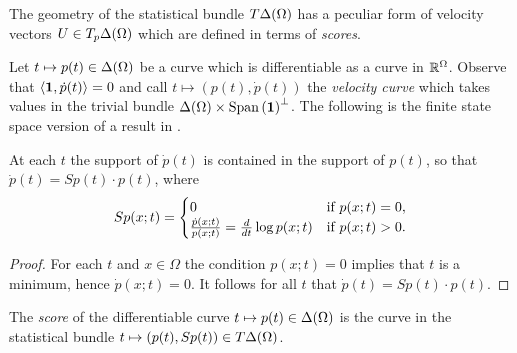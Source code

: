 \documentclass[12pt,a4paper]{amsart}
\begin{document}

The geometry of the statistical bundle $T\Delta(\Omega)$ has a peculiar form of velocity vectors $U \in T_p\Delta(\Omega)$ which are defined in terms of \emph{scores}.

Let $t \mapsto p(t) \in \Delta(\Omega)$ be a curve which is differentiable as a curve in $\mathbb R^\Omega$. Observe that $\left\langle \bm 1 , \dot p(t) \right\rangle = 0$  and call $t \mapsto (p(t),\dot p(t))$ the \emph{velocity curve} which takes values in the trivial bundle $\Delta(\Omega) \times \operatorname{Span}\left(\bm 1\right)^\perp$. The following is the finite state space version of a result in \cite{2015arXiv151007305A}.

\begin{proposition}
At each $t$ the support of $\dot p(t)$ is contained in the support of $p(t)$, so that $\dot p(t) = Sp(t) \cdot p(t)$, where
%
\begin{equation}\label{eq:score}
Sp(x;t) = 
\begin{cases} 0 & \text{if $p(x;t) = 0$}, \\ \frac{\dot p(x;t)}{p(x;t)} = \frac{d}{dt} \log p(x;t) & \text{if $p(x;t) > 0$.}
  \end{cases} 
\end{equation}
\end{proposition}

\begin{proof}
For each $t$ and $x \in \Omega$ the condition $p(x;t) = 0$ implies that $t$ is a minimum, hence $\dot p(x;t) = 0$. It follows for all $t$ that $\dot p(t) = Sp(t) \cdot p(t)$.  
\end{proof}

\begin{definition}
The \emph{score} of the differentiable curve $t \mapsto p(t) \in \Delta(\Omega)$ is the curve in the statistical bundle $t \mapsto (p(t),Sp(t)) \in T\Delta(\Omega)$.
\end{definition}
\end{document}
